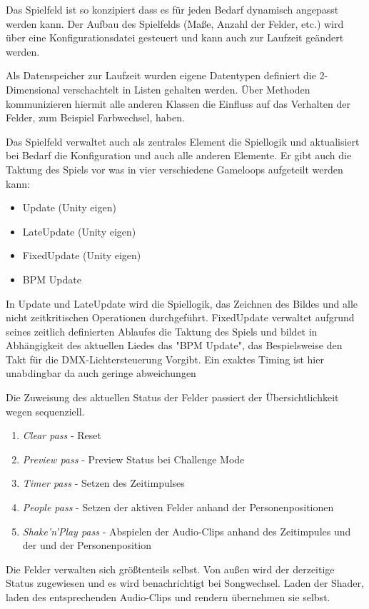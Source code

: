
Das Spielfeld ist so konzipiert dass es für jeden Bedarf dynamisch angepasst werden kann. Der Aufbau des Spielfelds (Maße, Anzahl der Felder, etc.) wird über eine Konfigurationsdatei gesteuert und kann auch zur Laufzeit geändert werden.

Als Datenspeicher zur Laufzeit wurden eigene Datentypen definiert die 2-Dimensional verschachtelt in Listen gehalten werden. Über Methoden kommunizieren hiermit alle anderen Klassen die Einfluss auf das Verhalten der Felder, zum Beispiel Farbwechsel, haben.

Das Spielfeld verwaltet auch als zentrales Element die Spiellogik und aktualisiert bei Bedarf die Konfiguration und auch alle anderen Elemente. Er gibt auch die Taktung des Spiels vor was in vier verschiedene Gameloops aufgeteilt werden kann:
\begin{itemize}
\item Update (Unity eigen)
\item LateUpdate (Unity eigen)
\item FixedUpdate (Unity eigen)
\item BPM Update
\end{itemize}

In Update und LateUpdate wird die Spiellogik, das Zeichnen des Bildes und alle nicht zeitkritischen Operationen durchgeführt.
FixedUpdate verwaltet aufgrund seines zeitlich definierten Ablaufes die Taktung des Spiels und bildet in Abhängigkeit des aktuellen Liedes das "BPM Update", das Bespielsweise den Takt für die DMX-Lichtersteuerung Vorgibt.
Ein exaktes Timing ist hier unabdingbar da auch geringe abweichungen 

Die Zuweisung des aktuellen Status der Felder passiert der Übersichtlichkeit wegen sequenziell.
\begin{enumerate}
\item \emph{Clear pass} - Reset
\item \emph{Preview pass} - Preview Status bei Challenge Mode
\item \emph{Timer pass} - Setzen des Zeitimpulses
\item \emph{People pass} - Setzen der aktiven Felder anhand der Personenpositionen
\item \emph{Shake'n'Play pass} - Abspielen der Audio-Clips anhand des Zeitimpules und der und der Personenposition
\end{enumerate}

Die Felder verwalten sich größtenteils selbst. Von außen wird der derzeitige Status zugewiesen und es wird benachrichtigt bei Songwechsel. Laden der Shader, laden des entsprechenden Audio-Clips und rendern übernehmen sie selbst.